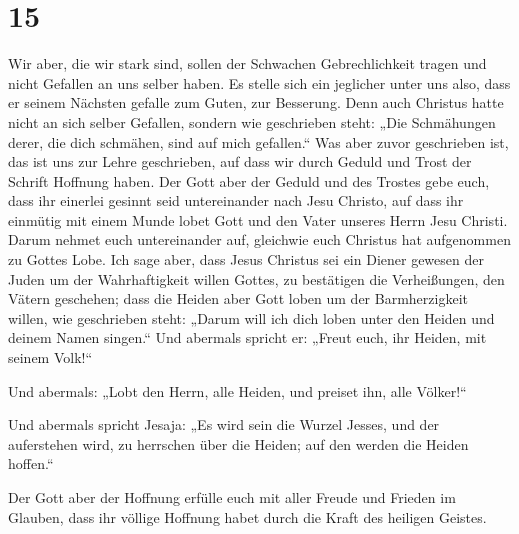 \hypertarget{section-14}{%
\section{15}\label{section-14}}

 Wir aber, die wir stark sind, sollen der Schwachen
Gebrechlichkeit tragen und nicht Gefallen an uns selber haben.
 Es stelle sich ein jeglicher unter uns also, dass er
seinem Nächsten gefalle zum Guten, zur Besserung.  Denn
auch Christus hatte nicht an sich selber Gefallen, sondern wie
geschrieben steht: „Die Schmähungen derer, die dich schmähen, sind auf
mich gefallen.``  Was aber zuvor geschrieben ist, das ist
uns zur Lehre geschrieben, auf dass wir durch Geduld und Trost der
Schrift Hoffnung haben.  Der Gott aber der Geduld und des
Trostes gebe euch, dass ihr einerlei gesinnt seid untereinander nach
Jesu Christo,  auf dass ihr einmütig mit einem Munde lobet
Gott und den Vater unseres Herrn Jesu Christi.  Darum
nehmet euch untereinander auf, gleichwie euch Christus hat aufgenommen
zu Gottes Lobe.  Ich sage aber, dass Jesus Christus sei
ein Diener gewesen der Juden um der Wahrhaftigkeit willen Gottes, zu
bestätigen die Verheißungen, den Vätern geschehen;  dass
die Heiden aber Gott loben um der Barmherzigkeit willen, wie geschrieben
steht: „Darum will ich dich loben unter den Heiden und deinem Namen
singen.``  Und abermals spricht er: „Freut euch, ihr
Heiden, mit seinem Volk!{}``

 Und abermals: „Lobt den Herrn, alle Heiden, und preiset
ihn, alle Völker!{}``

 Und abermals spricht Jesaja: „Es wird sein die Wurzel
Jesses, und der auferstehen wird, zu herrschen über die Heiden; auf den
werden die Heiden hoffen.``

 Der Gott aber der Hoffnung erfülle euch mit aller Freude
und Frieden im Glauben, dass ihr völlige Hoffnung habet durch die Kraft
des heiligen Geistes.

